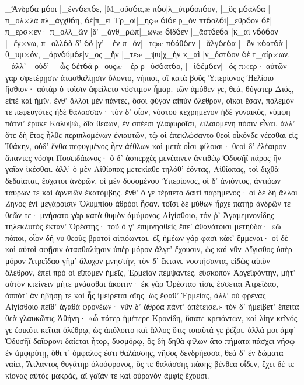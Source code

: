 _Ἄνδρỽα μỽοι |_ἔννỽεπỽε, |Μ_οῦσỽα,æ πỽο|λ_ύτρỽοπỽον, |_ὃς μỽάλỽα |π_ολ×λὰ
πλ_άγχθỽη, ỽἐ|π_εὶ Τρ_οί|_ηςæ ỽἱỽε|ρ_ὸν πτỽολỽί|_εθρỽον ỽἔ|π_ερσ×εν·
π_ολλ_ῶν |δ’ _ἀνθ_ρώπ|_ωνæ ỽἴδỽεν |_ἄστỽεỽα |κ_αὶ νỽόỽον |_ἔγ×νω,
π_ολλỽὰ δ’ ỽὅ |γ’ _ἐν π_όν|_τῳæ πỽάθỽεν |_ἄλγỽεỽα |_ὃν κỽατỽὰ |θ_υμ×όν,
_ἀρνỽύμỽε|ν_ος _ἥν |_τεæ _ψυ|χ_ὴν κ_αὶ |ν_όστỽον ỽἑ|τ_αίρ×ων.
_ἀλλ' _οὐδ' |_ὧς ỽἑτỽά|ρ_ουςæ _ἐρ|ρ_ύσỽατỽο, |_ἱỽέμỽεν|_ός π×ερ·
αὐτῶν γὰρ σφετέρῃσιν ἀτασθαλίῃσιν ὄλοντο,
νήπιοι, οἳ κατὰ βοῦς Ὑπερίονος Ἠελίοιο
ἤσθιον· αὐτὰρ ὁ τοῖσιν ἀφείλετο νόστιμον ἦμαρ.
τῶν ἁμόθεν γε, θεά, θύγατερ Διός, εἰπὲ καὶ ἡμῖν.    
\nstanza
ἔνθ' ἄλλοι μὲν πάντες, ὅσοι φύγον αἰπὺν ὄλεθρον,
οἴκοι ἔσαν, πόλεμόν τε πεφευγότες ἠδὲ θάλασσαν·
τὸν δ' οἶον, νόστου κεχρημένον ἠδὲ γυναικός,
νύμφη πότνι' ἔρυκε Καλυψώ, δῖα θεάων,
ἐν σπέεσι γλαφυροῖσι, λιλαιομένη πόσιν εἶναι.
ἀλλ' ὅτε δὴ ἔτος ἦλθε περιπλομένων ἐνιαυτῶν,
τῷ οἱ ἐπεκλώσαντο θεοὶ οἶκόνδε νέεσθαι
εἰς Ἰθάκην, οὐδ' ἔνθα πεφυγμένος ἦεν ἀέθλων
καὶ μετὰ οἷσι φίλοισι· θεοὶ δ' ἐλέαιρον ἅπαντες
νόσφι Ποσειδάωνος· ὁ δ' ἀσπερχὲς μενέαινεν    
ἀντιθέῳ Ὀδυσῆϊ πάρος ἣν γαῖαν ἱκέσθαι.
ἀλλ' ὁ μὲν Αἰθίοπας μετεκίαθε τηλόθ' ἐόντας,
Αἰθίοπας, τοὶ διχθὰ δεδαίαται, ἔσχατοι ἀνδρῶν,
οἱ μὲν δυσομένου Ὑπερίονος, οἱ δ' ἀνιόντος,
ἀντιόων ταύρων τε καὶ ἀρνειῶν ἑκατόμβης.
ἔνθ' ὅ γε τέρπετο δαιτὶ παρήμενος· οἱ δὲ δὴ ἄλλοι
Ζηνὸς ἐνὶ μεγάροισιν Ὀλυμπίου ἁθρόοι ἦσαν.
τοῖσι δὲ μύθων ἦρχε πατὴρ ἀνδρῶν τε θεῶν τε·
μνήσατο γὰρ κατὰ θυμὸν ἀμύμονος Αἰγίσθοιο,
τόν ῥ' Ἀγαμεμνονίδης τηλεκλυτὸς ἔκταν' Ὀρέστης·    
τοῦ ὅ γ' ἐπιμνησθεὶς ἔπε' ἀθανάτοισι μετηύδα·
\nstanza
«ὢ πόποι, οἷον δή νυ θεοὺς βροτοὶ αἰτιόωνται.
ἐξ ἡμέων γάρ φασι κάκ' ἔμμεναι· οἱ δὲ καὶ αὐτοὶ
σφῇσιν ἀτασθαλίῃσιν ὑπὲρ μόρον ἄλγε' ἔχουσιν,
ὡς καὶ νῦν Αἴγισθος ὑπὲρ μόρον Ἀτρεΐδαο
γῆμ' ἄλοχον μνηστήν, τὸν δ' ἔκτανε νοστήσαντα,
εἰδὼς αἰπὺν ὄλεθρον, ἐπεὶ πρό οἱ εἴπομεν ἡμεῖς,
Ἑρμείαν πέμψαντες, ἐΰσκοπον Ἀργεϊφόντην,
μήτ' αὐτὸν κτείνειν μήτε μνάασθαι ἄκοιτιν·
ἐκ γὰρ Ὀρέσταο τίσις ἔσσεται Ἀτρεΐδαο,    
ὁππότ' ἂν ἡβήσῃ τε καὶ ἧς ἱμείρεται αἴης.
ὣς ἔφαθ' Ἑρμείας, ἀλλ' οὐ φρένας Αἰγίσθοιο
πεῖθ' ἀγαθὰ φρονέων· νῦν δ' ἁθρόα πάντ' ἀπέτεισε.»
\nstanza
τὸν δ' ἠμείβετ' ἔπειτα θεὰ γλαυκῶπις Ἀθήνη·
«ὦ πάτερ ἡμέτερε Κρονίδη, ὕπατε κρειόντων,
καὶ λίην κεῖνός γε ἐοικότι κεῖται ὀλέθρῳ,
ὡς ἀπόλοιτο καὶ ἄλλος ὅτις τοιαῦτά γε ῥέζοι.
ἀλλά μοι ἀμφ' Ὀδυσῆϊ δαΐφρονι δαίεται ἦτορ,
δυσμόρῳ, ὃς δὴ δηθὰ φίλων ἄπο πήματα πάσχει
νήσῳ ἐν ἀμφιρύτῃ, ὅθι τ' ὀμφαλός ἐστι θαλάσσης,    
νῆσος δενδρήεσσα, θεὰ δ' ἐν δώματα ναίει,
Ἄτλαντος θυγάτηρ ὀλοόφρονος, ὅς τε θαλάσσης
πάσης βένθεα οἶδεν, ἔχει δέ τε κίονας αὐτὸς
μακράς, αἳ γαῖάν τε καὶ οὐρανὸν ἀμφὶς ἔχουσι.

